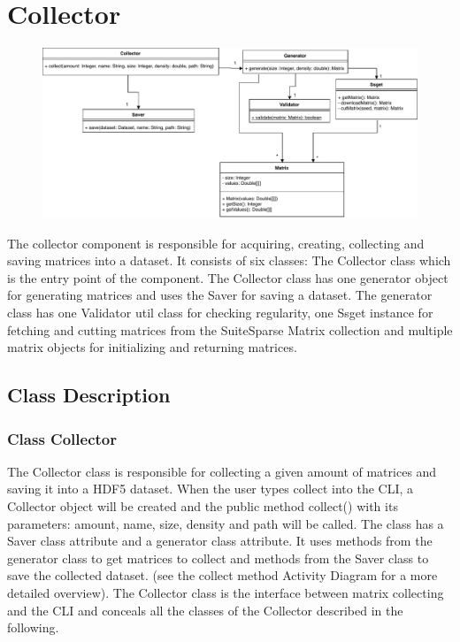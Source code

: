 \documentclass[parskip=full]{scrartcl}
\begin{document}
\section{Collector}
\begin{figure}[h]
\begin{center}
\includegraphics[width=\textwidth, height= \textheight, keepaspectratio]{ClassDiagrams/PDF/Collector_classdiagram.pdf}
%
\label{Activity Diagrams}
\end{center}
\end{figure}

The collector component is responsible for acquiring, creating, collecting and saving matrices into a dataset.
It consists of six classes:
The Collector class which is the entry point of the component.
The Collector class has one generator object for generating matrices and uses the Saver for saving a dataset.
The generator class has one Validator util class for checking regularity, one Ssget instance for fetching and cutting matrices from the SuiteSparse Matrix collection and multiple matrix objects for initializing and returning matrices.

\subsection{Class Description}

\subsubsection{Class Collector}
The Collector class is responsible for collecting a given amount of matrices and saving it into a \gls{HDF5} dataset.
When the user types collect into the \gls{CLI}, a Collector object will be created and the public method collect() with its parameters:
amount, name, size, density and path
will be called. 
The class has a Saver class attribute and a generator class attribute.
It uses methods from the generator class to get matrices to collect and methods from the Saver class to save the collected dataset.
(see the collect method Activity Diagram for a more detailed overview).
The Collector class is the interface between matrix collecting and the \gls{CLI} and conceals all the classes of the Collector described in the following.
\end{document}
